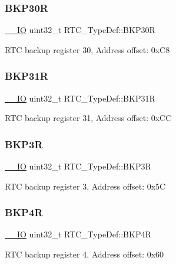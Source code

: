 \subsubsection{\texorpdfstring{BKP30R}{BKP30R}}
{\footnotesize\ttfamily \mbox{\hyperlink{core__sc300_8h_aec43007d9998a0a0e01faede4133d6be}{\+\_\+\+\_\+\+IO}} uint32\+\_\+t R\+T\+C\+\_\+\+Type\+Def\+::\+B\+K\+P30R}

R\+TC backup register 30, Address offset\+: 0x\+C8 \mbox{\label{struct_r_t_c___type_def_a4bccd0b2feecc2e2159898857bab6d89}} 
\subsubsection{\texorpdfstring{BKP31R}{BKP31R}}
{\footnotesize\ttfamily \mbox{\hyperlink{core__sc300_8h_aec43007d9998a0a0e01faede4133d6be}{\+\_\+\+\_\+\+IO}} uint32\+\_\+t R\+T\+C\+\_\+\+Type\+Def\+::\+B\+K\+P31R}

R\+TC backup register 31, Address offset\+: 0x\+CC \mbox{\label{struct_r_t_c___type_def_ac3802c3b17482a0667fb34ddd1863434}} 
\subsubsection{\texorpdfstring{BKP3R}{BKP3R}}
{\footnotesize\ttfamily \mbox{\hyperlink{core__sc300_8h_aec43007d9998a0a0e01faede4133d6be}{\+\_\+\+\_\+\+IO}} uint32\+\_\+t R\+T\+C\+\_\+\+Type\+Def\+::\+B\+K\+P3R}

R\+TC backup register 3, Address offset\+: 0x5C \mbox{\label{struct_r_t_c___type_def_a6131b2f2896c122cf223206e4cfd2bd0}} 
\subsubsection{\texorpdfstring{BKP4R}{BKP4R}}
{\footnotesize\ttfamily \mbox{\hyperlink{core__sc300_8h_aec43007d9998a0a0e01faede4133d6be}{\+\_\+\+\_\+\+IO}} uint32\+\_\+t R\+T\+C\+\_\+\+Type\+Def\+::\+B\+K\+P4R}

R\+TC backup register 4, Address offset\+: 0x60 \mbox{\label{struct_r_t_c___type_def_a0f3a33de81247ec5729e400a1261f917}} 
